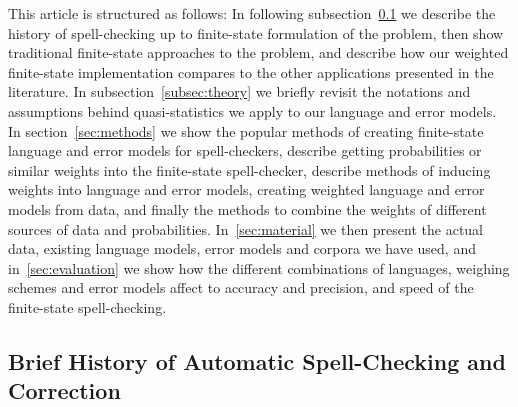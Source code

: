 \documentclass[a4paper,12pt]{article}
\begin{document}
This article is structured as follows: In following
subsection~\ref{subsec:background} we describe the history of spell-checking up
to finite-state formulation of the problem, then show traditional finite-state
approaches to the problem, and describe how our weighted finite-state
implementation compares to the other applications presented in the literature.
In subsection~\ref{subsec:theory} we briefly revisit the notations and
assumptions behind quasi-statistics we apply to our language and error models.
In section~\ref{sec:methods} we show the popular methods of creating
finite-state language and error models for spell-checkers, describe getting
probabilities or similar weights into the finite-state spell-checker, describe
methods of inducing weights into language and error models, creating weighted
language and error models from data, and finally the methods to combine the
weights of different sources of data and probabilities. In~\ref{sec:material}
we then present the actual data, existing language models, error models and
corpora we have used, and in~\ref{sec:evaluation} we show how the different
combinations of languages, weighing schemes and error models affect to accuracy
and precision, and speed of the finite-state spell-checking.

\subsection{Brief History of Automatic Spell-Checking and Correction}
\label{subsec:background}
\end{document}
